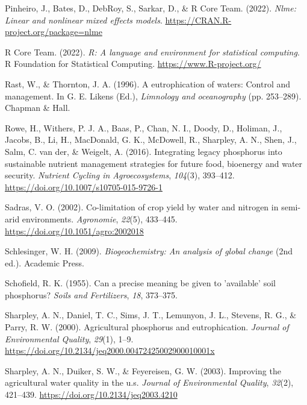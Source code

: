 \documentclass[
  a4paper,
]{article}
\newlength{\cslhangindent}
\newenvironment{CSLReferences}[2] %
 {\begin{list}{}{%
  \setlength{\itemindent}{0pt}
  \setlength{\leftmargin}{0pt}
  \setlength{\parsep}{0pt}
  \ifodd #1
   \setlength{\leftmargin}{\cslhangindent}
   \setlength{\itemindent}{-1\cslhangindent}
  \fi
  \setlength{\itemsep}{#2\baselineskip}}}
 {\end{list}}
\begin{document}
\begin{CSLReferences}{1}{0}
Pinheiro, J., Bates, D., DebRoy, S., Sarkar, D., \& R Core Team. (2022).
\emph{Nlme: Linear and nonlinear mixed effects models}.
\url{https://CRAN.R-project.org/package=nlme}

R Core Team. (2022). \emph{R: A language and environment for statistical
computing}. R Foundation for Statistical Computing.
\url{https://www.R-project.org/}

Rast, W., \& Thornton, J. A. (1996). A eutrophication of waters: Control
and management. In G. E. Likens (Ed.), \emph{Limnology and oceanography}
(pp. 253--289). Chapman \& Hall.

Rowe, H., Withers, P. J. A., Baas, P., Chan, N. I., Doody, D., Holiman,
J., Jacobs, B., Li, H., MacDonald, G. K., McDowell, R., Sharpley, A. N.,
Shen, J., Salm, C. van der, \& Weigelt, A. (2016). Integrating legacy
phosphorus into sustainable nutrient management strategies for future
food, bioenergy and water security. \emph{Nutrient Cycling in
Agroecosystems}, \emph{104}(3), 393--412.
\url{https://doi.org/10.1007/s10705-015-9726-1}

Sadras, V. O. (2002). Co-limitation of crop yield by water and nitrogen
in semi-arid environments. \emph{Agronomie}, \emph{22}(5), 433--445.
\url{https://doi.org/10.1051/agro:2002018}

Schlesinger, W. H. (2009). \emph{Biogeochemistry: An analysis of global
change} (2nd ed.). Academic Press.

Schofield, R. K. (1955). Can a precise meaning be given to 'available'
soil phosphorus? \emph{Soils and Fertilizers}, \emph{18}, 373--375.

Sharpley, A. N., Daniel, T. C., Sims, J. T., Lemunyon, J. L., Stevens,
R. G., \& Parry, R. W. (2000). Agricultural phosphorus and
eutrophication. \emph{Journal of Environmental Quality}, \emph{29}(1),
1--9. \url{https://doi.org/10.2134/jeq2000.00472425002900010001x}

Sharpley, A. N., Duiker, S. W., \& Feyereisen, G. W. (2003). Improving
the agricultural water quality in the u.s. \emph{Journal of
Environmental Quality}, \emph{32}(2), 421--439.
\url{https://doi.org/10.2134/jeq2003.4210}


\end{CSLReferences}
\end{document}
